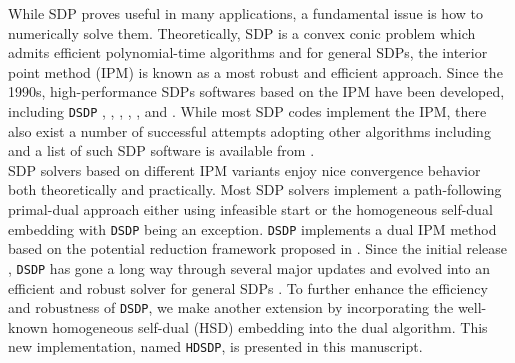 \documentclass[10pt]{article}
\begin{document}
While SDP proves useful in many applications, a fundamental issue is how to
numerically solve them. Theoretically, SDP is a convex conic problem which
admits efficient polynomial-time algorithms and for general SDPs, the interior
point method (IPM) is known as a most robust and efficient approach. Since the
1990s, high-performance SDPs softwares based on the IPM have been developed,
including {{\texttt{DSDP}}} {\cite{benson2008algorithm}}, 
{\cite{copt}},  {\cite{aps2019mosek}}, 
{\cite{polik2007sedumi}},  {\cite{toh2012implementation}},
 {\cite{borchers2006csdp}} and 
{\cite{yamashita2012latest}}. While most SDP codes implement the IPM, there also exist
a number of successful attempts adopting other algorithms including
{\cite{kocvara2006pensdp, kwasniewiczimplementation, yang2015sdpnal}}
and a list of such SDP software is available from {\cite{majumdar2020recent}}.\\

SDP solvers based on different IPM variants enjoy nice convergence behavior
both theoretically and practically. Most SDP solvers implement a
path-following primal-dual approach either using infeasible start
{\cite{potra1998superlinearly}} or the homogeneous self-dual embedding
{\cite{potra1998homogeneous}} with {{\texttt{DSDP}}} being an exception.
{{\texttt{DSDP}}} implements a dual IPM method based on the potential reduction framework 
proposed in {\cite{benson1999mixed}}.
Since the initial release {\cite{benson2000solving}}, {{\texttt{DSDP}}} has
gone a long way through several major updates and evolved into an
efficient and robust solver for general SDPs {\cite{benson2008algorithm}}.
To further enhance the efficiency and robustness of {{\texttt{DSDP}}}, we make
another extension by incorporating the well-known homogeneous self-dual (HSD)
embedding into the dual algorithm. This new implementation, named
{{\texttt{HDSDP}}}, is presented in this manuscript.\\
\end{document}
